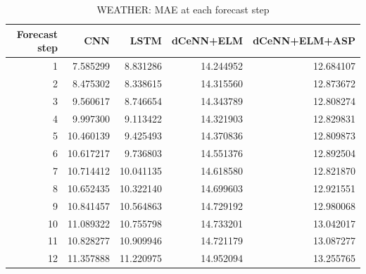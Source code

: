 \begin{table}
\caption{WEATHER: MAE at each forecast step}
\begin{tabular}{rrrrr}
\toprule
Forecast step & CNN & LSTM & dCeNN+ELM & dCeNN+ELM+ASP \\
\midrule
1 & 7.585299 & 8.831286 & 14.244952 & 12.684107 \\
2 & 8.475302 & 8.338615 & 14.315560 & 12.873672 \\
3 & 9.560617 & 8.746654 & 14.343789 & 12.808274 \\
4 & 9.997300 & 9.113422 & 14.321903 & 12.829831 \\
5 & 10.460139 & 9.425493 & 14.370836 & 12.809873 \\
6 & 10.617217 & 9.736803 & 14.551376 & 12.892504 \\
7 & 10.714412 & 10.041135 & 14.618580 & 12.821870 \\
8 & 10.652435 & 10.322140 & 14.699603 & 12.921551 \\
9 & 10.841457 & 10.564863 & 14.729192 & 12.980068 \\
10 & 11.089322 & 10.755798 & 14.733201 & 13.042017 \\
11 & 10.828277 & 10.909946 & 14.721179 & 13.087277 \\
12 & 11.357888 & 11.220975 & 14.952094 & 13.255765 \\
\bottomrule
\end{tabular}
\end{table}
